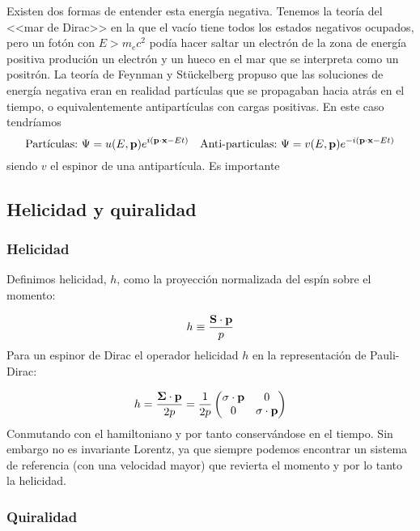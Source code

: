Existen dos formas de entender esta energía negativa. Tenemos la teoría del <<mar de Dirac>> en la que el vacío tiene todos los estados negativos ocupados, pero un fotón con $E>m_ec^2$ podía hacer saltar un electrón de la zona de energía positiva produción un electrón y un hueco en el mar que se interpreta como un positrón. La teoría de Feynman y Stückelberg propuso que las soluciones de energía negativa eran en realidad partículas que se propagaban hacia atrás en el tiempo, o equivalentemente antipartículas con cargas positivas. En este caso tendríamos 
\begin{equation}
	\text{Partículas:} \ \Psi = u (E,\mathbf{p}) e^{i(\mathbf{p} \cdot \mathbf{x} - Et)} \quad
	\text{Anti-particulas:} \ \Psi = v (E,\mathbf{p}) e^{-i(\mathbf{p} \cdot \mathbf{x} - Et)}
\end{equation}
siendo $v$ el espinor de una antipartícula. Es importante 

\subsection{Helicidad y quiralidad}

\subsubsection{Helicidad}

Definimos helicidad, $h$, como la proyección normalizada del espín sobre el momento:

\begin{equation}
	h \equiv \frac{\mathbf{S} \cdot \mathbf{p}}{p}
\end{equation}
Para un espinor de Dirac el operador helicidad $h$ en la representación de Pauli-Dirac:

\begin{equation}
	h = \frac{\boldsymbol{\Sigma} \cdot \mathbf{p}}{2p} = \frac{1}{2p} \begin{pmatrix}
		\sigma \cdot \mathbf{p} & 0 \\
		0 & \sigma \cdot \mathbf{p}
	\end{pmatrix}
\end{equation}
Conmutando con el hamiltoniano y por tanto conservándose en el tiempo. Sin embargo no es invariante Lorentz, ya que siempre podemos encontrar un sistema de referencia (con una velocidad mayor) que revierta el momento y por lo tanto la helicidad. 


\subsubsection{Quiralidad}

